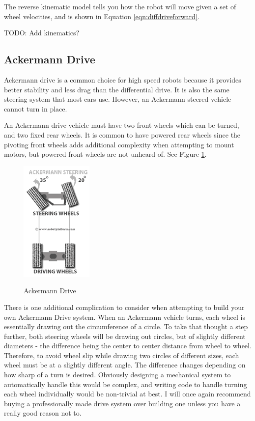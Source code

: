 The reverse kinematic model tells you how the robot will move given a set of wheel velocities, and is shown in Equation \ref{eqn:diffdriveforward}.

TODO: Add kinematics?

\subsection{Ackermann Drive}

Ackermann drive is a common choice for high speed robots because it provides better stability and less drag than the differential drive. It is also the same steering system that most cars use. However, an Ackermann steered vehicle cannot turn in place.

An Ackermann drive vehicle must have two front wheels which can be turned, and two fixed rear wheels. It is common to have powered rear wheels since the pivoting front wheels adds additional complexity when attempting to mount motors, but powered front wheels are not unheard of. See Figure \ref{fig:ackermann}.

\begin{figure}[h]
\centering
\includegraphics[scale=0.75]{Ackermann_Drive2.png}
\label{fig:ackermann}
\caption{Ackermann Drive}
\end{figure}

There is one additional complication to consider when attempting to build your own Ackermann Drive system. When an Ackermann vehicle turns, each wheel is essentially drawing out the circumference of a circle. To take that thought a step further, both steering wheels will be drawing out circles, but of slightly different diameters - the difference being the center to center distance from wheel to wheel. Therefore, to avoid wheel slip while drawing two circles of different sizes, each wheel must be at a slightly different angle. The difference changes depending on how sharp of a turn is desired. Obviously designing a mechanical system to automatically handle this would be complex, and writing code to handle turning each wheel individually would be non-trivial at best. I will once again recommend buying a professionally made drive system over building one unless you have a really good reason not to.

